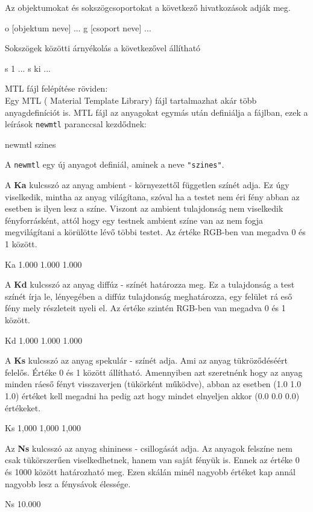 \noindent Az objektumokat és sokszögcsoportokat a következő hivatkozások adják meg.
\bigskip
\begin{python}
o [objektum neve]
  ...
  g [csoport neve]
  ...
\end{python}
\bigskip
Sokszögek közötti árnyékolás a következővel állítható
\bigskip
\begin{python}
s 1
  ...
  s ki
  ...
\end{python}
\bigskip

MTL fájl felépítése röviden:\\

Egy MTL ( Material Template Library) fájl tartalmazhat akár több anyagdefiníciót is. MTL fájl az anyagokat egymás után definiálja a fájlban, ezek a leírások \texttt{newmtl} paranccsal kezdődnek:
\bigskip
\begin{python}
newmtl szines
\end{python}
\bigskip
A \texttt{newmtl} egy új anyagot definiál, aminek a neve \texttt{"szines"}.
\newpage

\noindent A \textbf{Ka} kulcsszó az anyag ambient - környezettől független színét adja. Ez úgy viselkedik, mintha az anyag világítana, szóval ha a testet nem éri fény abban az esetben is ilyen lesz a színe. Viszont  az ambient tulajdonság nem viselkedik fényforrásként, attól hogy egy testnek ambient színe van az nem fogja megvilágítani a körülötte lévő többi testet. Az értéke RGB-ben van megadva 0 és 1 között.
\bigskip
\begin{python}
Ka 1.000 1.000 1.000
\end{python}
\bigskip
A \textbf{Kd} kulcsszó az anyag diffúz -  színét határozza meg. Ez a tulajdonság a test színét írja le, lényegében a diffúz tulajdonság meghatározza, egy felület rá eső fény mely részleteit nyeli el. Az értéke szintén RGB-ben van megadva 0 és 1 között.
\bigskip
\begin{python}
Kd 1.000 1.000 1.000
\end{python}
\bigskip
A \textbf{Ks} kulcsszó az anyag spekulár - színét adja. Ami az anyag tükröződéséért felelős. Értéke 0 és 1 között állítható. Amennyiben azt szeretnénk hogy az anyag minden ráeső fényt visszaverjen (tükörként működve), abban az esetben (1.0 1.0 1.0) értéket kell megadni ha pedig azt hogy mindet elnyeljen akkor (0.0 0.0 0.0) értékeket.
\bigskip
\begin{python}
Ks 1,000 1,000 1,000
\end{python}
\bigskip
Az \textbf{Ns} kulcsszó az anyag shininess - csillogását adja. Az anyagok felszíne nem csak tükörszerűen viselkedhetnek, hanem van saját fényük is. Ennek az értéke 0 és 1000 között határozható meg. Ezen skálán minél nagyobb értéket kap annál nagyobb lesz a fénysávok élessége.
\bigskip
\begin{python}
Ns 10.000
\end{python}
\bigskip
{}

